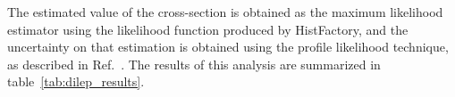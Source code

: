 

The estimated value of the cross-section is obtained as the maximum
likelihood estimator using the likelihood function produced by
HistFactory, and the uncertainty on that estimation is obtained using
the profile likelihood technique, as described in Ref.~\cite{ATL-CONF-2011-034}. 
The results of this analysis are summarized in table~\ref{tab:dilep_results}.



